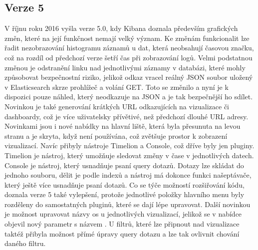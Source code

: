\documentclass[czech,BP]{thesiskiv}
\begin{document}
 \subsection{Verze 5}
 V říjnu roku 2016 vyšla verze 5.0, kdy Kibana doznala především grafických změn, které na její funkčnost nemají velký význam. Ke změnám funkcionalit lze řadit nezobrazování histogramu záznamů u dat, která neobsahují časovou značku, což na rozdíl od předchozí verze šetří čas při zobrazování logů. Velmi podstatnou změnou je odstranění linku nad jednotlivými záznamy v databázi, které mohly způsobovat bezpečnostní riziko, jelikož odkaz vracel reálný JSON soubor uložený v Elasticsearch skrze prohlížeč a volání GET. Toto se změnilo a nyní je k dispozici pouze náhled, který neodkazuje na JSON a je tak bezpečnější ho sdílet. Novinkou je také generování krátkých URL odkazujících na vizualizace či dashboardy, což je více uživatelsky přívětivé, než předchozí dlouhé URL adresy. Novinkami jsou i nové nabídky na hlavní liště, která byla přesunuta na levou stranu a je skryta, když není používána, což zvětšuje prostor k zobrazení vizualizací. Navíc přibyly nástroje Timelion a Console, což dříve byly jen pluginy. Timelion je nástroj, který umožňuje sledovat změny v čase v jednotlivých datech. Console je nástroj, který usnadňuje psaní query dotazů. Dotazy lze skládat do jednoho souboru, dělit je podle indexů a nástroj má dokonce funkci našeptávače, který ještě více usnadňuje psaní dotazů. Co se týče možností rozšiřování kódu, doznala verze 5 také vylepšení, protože jednotlivé položky hlavního menu byly rozděleny do samostatných pluginů, které se dají lépe upravovat. Další novinkou je možnost upravovat názvy os u jednotlivých vizualizací, jelikož se v nabídce objevil nový parametr s názvem . U filtrů, které lze připnout nad vizualizace taktéž přibyla možnost přímé úpravy query dotazu a lze tak ovlivnit chování daného filtru. \cite{Kibana5intro}

 
\end{document}

